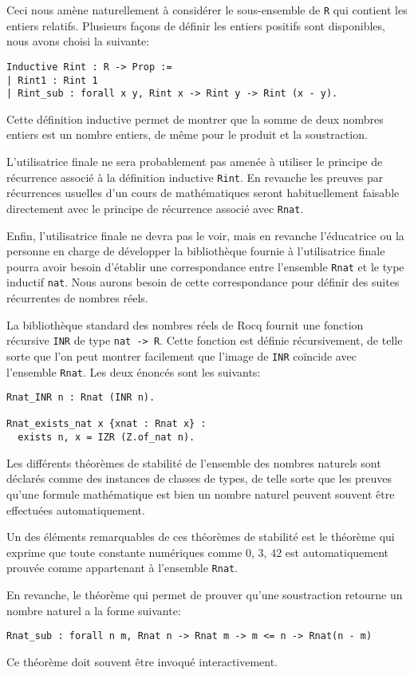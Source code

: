 \documentclass[draft]{jflart}
\begin{document}
Ceci nous amène naturellement à considérer le sous-ensemble de \texttt{R}
qui contient les entiers relatifs.  Plusieurs façons de définir les
entiers positifs sont disponibles, nous avons choisi la suivante:
\begin{verbatim}
Inductive Rint : R -> Prop :=
| Rint1 : Rint 1
| Rint_sub : forall x y, Rint x -> Rint y -> Rint (x - y).
\end{verbatim}
Cette définition inductive permet de montrer que la somme de deux
nombres entiers est un nombre entiers, de même pour le produit et
la soustraction.

L'utilisatrice finale ne sera probablement pas amenée à utiliser le
principe de récurrence associé à la définition inductive \texttt{Rint}.
En revanche les preuves par récurrences usuelles d'un cours de
mathématiques seront habituellement faisable directement avec le
principe de récurrence associé avec \texttt{Rnat}.

Enfin, l'utilisatrice finale ne devra pas le voir, mais en revanche
l'éducatrice ou la personne en charge de développer la bibliothèque
fournie à l'utilisatrice finale pourra avoir besoin d'établir une
correspondance entre l'ensemble \texttt{Rnat} et le type inductif
\texttt{nat}.  Nous aurons besoin de cette correspondance pour définir des
suites récurrentes de nombres réels.

La bibliothèque standard des nombres réels de Rocq fournit une fonction
récursive \texttt{INR} de type \texttt{nat -> R}.  Cette fonction est
définie récursivement, de telle sorte que l'on peut montrer facilement
que l'image de \texttt{INR} coïncide avec l'ensemble \texttt{Rnat}.  Les
deux énoncés sont les suivants:
\begin{verbatim}
Rnat_INR n : Rnat (INR n).

Rnat_exists_nat x {xnat : Rnat x} :
  exists n, x = IZR (Z.of_nat n).
\end{verbatim}

Les différents théorèmes de stabilité de l'ensemble des nombres naturels
sont déclarés comme des instances de classes de types, de telle sorte que
les preuves qu'une formule mathématique est bien un nombre naturel peuvent
souvent être effectuées automatiquement.

Un des éléments remarquables de ces théorèmes de stabilité est le théorème
qui exprime que toute constante numériques comme \(0\), \(3\), \(42\) est
automatiquement prouvée comme appartenant à l'ensemble \texttt{Rnat}.

En revanche, le théorème qui permet de prouver qu'une soustraction retourne un
nombre naturel a la forme suivante:
\begin{verbatim}
Rnat_sub : forall n m, Rnat n -> Rnat m -> m <= n -> Rnat(n - m)
\end{verbatim}
Ce théorème doit souvent être invoqué interactivement.
\end{document}
